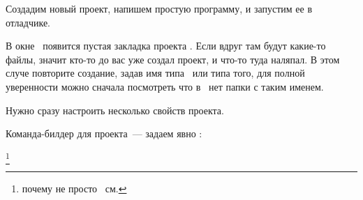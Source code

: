 \label{labecreprj}

Создадим новый проект, напишем простую программу, и запустим ее в отладчике.

\bigskip{}






 \bigskip В окне \eclpx\ появится пустая закладка
 проекта . Если вдруг там будут какие-то файлы, значит кто-то до вас уже
 создал проект, и что-то туда наляпал. В этом случе повторите создание, задав
 имя типа \ или типа того, для полной
 уверенности можно сначала посмотреть что в \ нет папки с таким именем.

\bigskip Нужно сразу настроить несколько свойств проекта.

\bigskip Команда-билдер для проекта\ --- задаем явно :

\bigskip{}


\footnote{почему не просто
\ см. }



